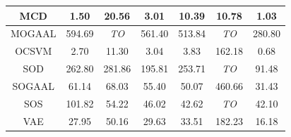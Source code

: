 \begin{table}[!t]
\begin{tabular}{|c|c|c|c|c|c|c|}
\hline
MCD &                1.50 &          20.56 &               3.01 &              10.39 &            10.78 &             1.03 \\
\hline
MOGAAL &              594.69 &    \textit{TO} &             561.40 &             513.84 &      \textit{TO} &           280.80 \\
\hline
OCSVM &                2.70 &          11.30 &               3.04 &               3.83 &           162.18 &             0.68 \\
\hline
SOD &              262.80 &         281.86 &             195.81 &             253.71 &      \textit{TO} &            91.48 \\
\hline
SOGAAL &               61.14 &          68.03 &              55.40 &              50.07 &           460.66 &            31.43 \\
\hline
SOS &              101.82 &          54.22 &              46.02 &              42.62 &      \textit{TO} &            42.10 \\
\hline
VAE &               27.95 &          50.16 &              29.63 &              33.51 &           182.23 &            16.18 \\
\hline
\end{tabular}
\end{table}


% 
% 

% 